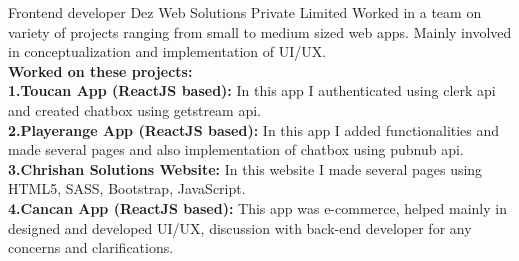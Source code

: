     {Frontend developer}
    {}
    {Dez Web Solutions Private Limited}
    {}
    {Worked in a team on variety of projects ranging from small to medium sized web apps. Mainly involved in conceptualization and implementation of UI/UX.
    \\ \textbf{Worked on these projects:}
    \\ \textbf{1.Toucan App (ReactJS based):} In this app I authenticated using clerk api and created chatbox using getstream api.
    \\ \textbf{2.Playerange App (ReactJS based):} In this app I added functionalities and made several pages and also implementation of chatbox using pubnub api.
    \\ \textbf{3.Chrishan Solutions Website:} In this website I made several pages using HTML5, SASS, Bootstrap, JavaScript.
    \\ \textbf{4.Cancan App (ReactJS based):} This app was e-commerce, helped mainly in designed and developed UI/UX, discussion with back-end developer for any concerns and clarifications.
    }
    
    
    \vspace*{0.2\baselineskip}

